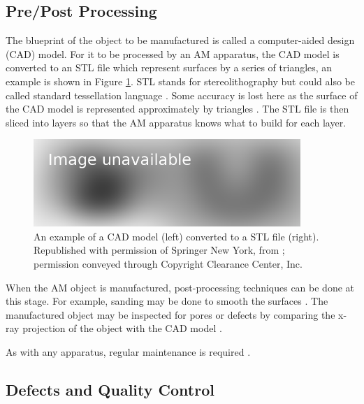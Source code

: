 \subsection{Pre/Post Processing}

The blueprint of the object to be manufactured is called a computer-aided design (CAD) model. For it to be processed by an AM apparatus, the CAD model is converted to an STL file \citep{3d1989sterolithography, 3d2019what} which represent surfaces by a series of triangles, an example is shown in Figure \ref{fig:literature_stl}. STL stands for stereolithography but could also be called standard tessellation language \citep{wong2012review}. Some accuracy is lost here as the surface of the CAD model is represented approximately by triangles \citep{gibson2010additive}. The STL file is then sliced into layers \citep{jamieson1995direct, vatani2009enhanced} so that the AM apparatus knows what to build for each layer.

\begin{figure}
  \centering
  \includegraphics[width=0.9\textwidth]{../figures/literatureReview/literature_stl.png}
  \caption{An example of a CAD model (left) converted to a STL file (right). Republished with permission of Springer New York, from \cite{gibson2010additive}; permission conveyed through Copyright
Clearance Center, Inc.}
  \label{fig:literature_stl}
\end{figure}

When the AM object is manufactured, post-processing techniques can be done at this stage. For example, sanding may be done to smooth the surfaces \citep{gibson2010additive}. The manufactured object may be inspected for pores or defects by comparing the x-ray projection of the object with the CAD model \citep{lee2015compliance, villarraga2015assessing, kim2016inspection}.

As with any apparatus, regular maintenance is required \citep{bell2014maintaining}.

\subsection{Defects and Quality Control}

